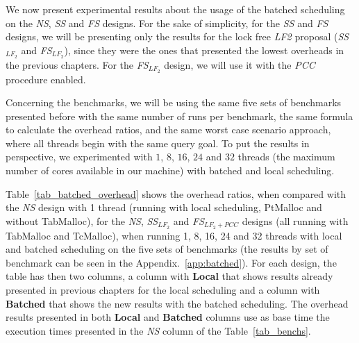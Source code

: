 \documentclass{llncs}
\begin{document}
We now present experimental results about the usage of the batched
scheduling on the \emph{NS}, \emph{SS} and \emph{FS} designs. For the
sake of simplicity, for the \emph{SS} and \emph{FS} designs, we will be
presenting only the results for the lock free \emph{LF2} proposal
(\emph{SS}$_{LF_2}$ and \emph{FS}$_{LF_2}$), since they were the ones
that presented the lowest overheads in the previous chapters. For the
\emph{FS}$_{LF_2}$ design, we will use it with the \emph{PCC} procedure
enabled.

Concerning the benchmarks, we will be using the same five sets of
benchmarks presented before with the same number of runs per
benchmark, the same formula to calculate the overhead ratios, and the
same worst case scenario approach, where all threads begin with the
same query goal. To put the results in perspective, we experimented
with $1$, $8$, $16$, $24$ and $32$ threads (the maximum number of
cores available in our machine) with batched and local scheduling.

Table~\ref{tab_batched_overhead} shows the overhead ratios, when
compared with the \emph{NS} design with 1 thread (running with local
scheduling, PtMalloc and without TabMalloc), for the \emph{NS},
\emph{SS}$_{LF_2}$ and \emph{FS}$_{LF_2+PCC}$ designs (all running with
TabMalloc and TcMalloc), when running 1, 8, 16, 24 and 32 threads with
local and batched scheduling on the five sets of benchmarks (the
results by set of benchmark can be seen in the
Appendix.~\ref{app:batched}). For each design, the table has then two
columns, a column with \textbf{Local} that shows results already
presented in previous chapters for the local scheduling and a column
with \textbf{Batched} that shows the new results with the batched
scheduling. The overhead results presented in both \textbf{Local} and
\textbf{Batched} columns use as base time the execution times
presented in the \emph{NS} column of the Table~\ref{tab_benchs}.
\end{document}

